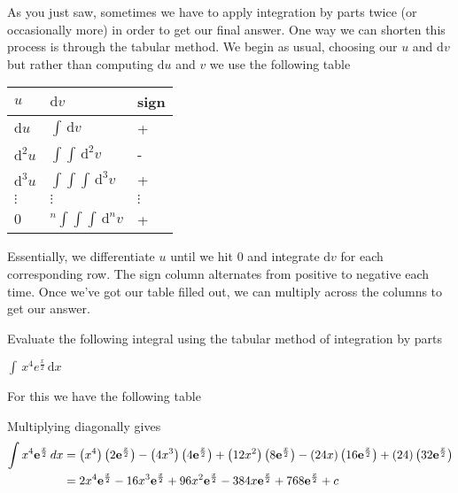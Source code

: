 \documentclass[addpoints]{exam}
\theoremstyle{definition}
\theoremstyle{plain}
\begin{document}
\ifprintanswers 
    \newpage 
\fi


\begin{tcolorbox}[breakable, title=\subsubsection{TABULAR METHOD}, colframe=black, sharp corners, colback=Azure4!30, colbacktitle=Firebrick2!60, coltitle=black]
    As you just saw, sometimes we have to apply integration by parts twice (or occasionally more) in order to get our final answer. One way we can shorten this process is through the tabular method. We begin as usual, choosing our $u$ and $\mathrm{d}v$ but rather than computing $\mathrm{d}u$ and $v$ we use the following table
   \begin{longtable}[h]{|C{1cm}|C{2cm}|C{1cm}|}
    \hline $u$ & $\mathrm{d}v$ & sign  \\\hline
        $\mathrm{d}u $ & $\displaystyle\int\,\mathrm{d}v$ & + \\\hline
        $\mathrm{d}^2u$ & $\displaystyle\int\int\,\mathrm{d}^2v$ & - \\\hline
        $\mathrm{d}^3u $ &  $\displaystyle\int\int\int\,\mathrm{d}^3v$ & + \\\hline
        $\vdots$ &  $\vdots$ & $\vdots$ \\\hline
        $ 0 $ &  $\displaystyle^{n}\int\int\int\,\mathrm{d}^{n}v$ & + \\\hline
    \end{longtable} 
    Essentially, we differentiate $u$ until we hit $0$ and integrate $\mathrm{d}v$ for each corresponding row. The sign column alternates from positive to negative each time. Once we've got our table filled out, we can multiply across the columns to get our answer. 
\end{tcolorbox}
Evaluate the following integral using the tabular method of integration by parts
\begin{questions}
    \question $\displaystyle \int\,x^4e^{\frac{x}{2}}\,\mathrm{d}x$
    \begin{solution}[\stretch{0.5}]
        For this we have the following table 
        
    Multiplying diagonally gives
    \begin{align*}\int{{{x^4}{{\bf{e}}^{\frac{x}{2}}}\,dx}} & = \left( {{x^4}} \right)\left( {2{{\bf{e}}^{\frac{x}{2}}}} \right) - \left( {4{x^3}} \right)\left( {4{{\bf{e}}^{\frac{x}{2}}}} \right) + \left( {12{x^2}} \right)\left( {8{{\bf{e}}^{\frac{x}{2}}}} \right) - \left( {24x} \right)\left( {16{{\bf{e}}^{\frac{x}{2}}}} \right) + \left( {24} \right)\left( {32{{\bf{e}}^{\frac{x}{2}}}} \right)\\ &  = 2{x^4}{{\bf{e}}^{\frac{x}{2}}} - 16{x^3}{{\bf{e}}^{\frac{x}{2}}} + 96{x^2}{{\bf{e}}^{\frac{x}{2}}} - 384x{{\bf{e}}^{\frac{x}{2}}} + 768{{\bf{e}}^{\frac{x}{2}}} + c\end{align*}
    \end{solution}
\end{questions}
\end{document}
